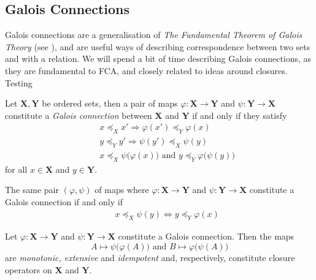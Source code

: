 \subsection{Galois Connections}
\label{subsection:galois-connections}

Galois connections are a generalisation of \textit{The Fundamental Theorem of Galois Theory} (see \cite[pp.
205]{bergman2015invitation}), and are useful ways of describing correspondence between two sets and with
a relation. We will spend a bit of time describing Galois connections, as they are fundamental to FCA,
and closely related to ideas around closures. Testing

\begin{definition}
  \label{definition:Galois-connection-1} Let $\mathbf{X}, \mathbf{Y}$ be ordered sets, then a pair
  of maps $\varphi \colon \mathbf{X}\to \mathbf{Y}$ and $\psi \colon \mathbf{Y}\to \mathbf{X}$
  constitute a \emph{Galois connection} between $\mathbf{X}$ and $\mathbf{Y}$ if and only if they satisfy
  \begin{align}
    \quad & x \preceq_{X}x' \Rightarrow \varphi (x') \preceq_{Y}\varphi (x) \label{equation:ord_galois-1}                             \\
    \quad & y \preceq_{Y}y' \Rightarrow \psi (y') \preceq_{X}\psi (y) \label{equation:ord-galois-2}                                   \\
    \quad & x \preceq_{X}\psi \big(\varphi (x)\big) \text{ and }y \preceq_{Y}\varphi \big(\psi (y)\big) \label{equation:ord-galois-3}
  \end{align}
  for all $x \in \mathbf{X}$ and $y \in \mathbf{Y}$.
\end{definition}

\begin{proposition}
  \label{proposition:fundemental-galois} The same pair $(\varphi, \psi)$ of maps where $\varphi \colon
  \mathbf{X}\to \mathbf{Y}$ and $\psi \colon \mathbf{Y}\to \mathbf{X}$ constitute a Galois connection
  if and only if
  \begin{align}
    \quad & x \preceq_{X}\psi (y) \Longleftrightarrow y \preceq_{Y}\varphi (x) \label{equation:ord-galois-4}
  \end{align}
\end{proposition}

\begin{proposition}
  \label{proposition:galois-connections-closure-operators} Let $\varphi \colon \mathbf{X}\to \mathbf{Y}$
  and $\psi \colon \mathbf{Y}\to \mathbf{X}$ constitute a Galois connection. Then the maps
  \[
    A \mapsto \psi \big(\varphi(A)\big) \text{ and }B \mapsto \varphi \big(\psi (A)\big)
  \]
  are \textit{monotonic, extensive} and \textit{idempotent} and, respectively, constitute closure
  operators on $\mathbf{X}$ and $\mathbf{Y}$.
\end{proposition}

